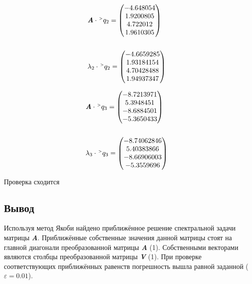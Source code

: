 \documentclass[a4paper, 14pt]{extarticle}
\begin{document}
\begin{center}
{\begin{minipage}{1.1\textwidth}
\begin{multicols}{4}
          \begin{align*}
            & \textbf{\textit{A}} \cdot \upgt q_2 = \begin{pmatrix}
              -4.648054 \\
                1.9200805 \\
               4.722012 \\
                1.9610305
              \end{pmatrix} \\\\
            & \lambda_2 \cdot \upgt q_2 = \begin{pmatrix}
              -4.6659285 \\
                1.93184154 \\
               4.70428488 \\
               1.94937347
              \end{pmatrix}
          \end{align*}

          \vspace{-3pt}

          \begin{align*}
            & \textbf{\textit{A}} \cdot \upgt q_3 = \begin{pmatrix}
              -8.7213971 \\
               5.3948451 \\
              -8.6884501 \\
              -5.3650433
              \end{pmatrix} \\\\
            & \lambda_3 \cdot \upgt q_3 = \begin{pmatrix}
              -8.74062846 \\
               5.40383866 \\
              -8.66906003 \\
              -5.3559696
              \end{pmatrix}
          \end{align*}
      \end{multicols}
    \end{minipage}
  }
\end{center}
\vspace{10pt}
\hspace{5mm} Проверка сходится


\subsection*{Вывод}

Используя метод Якоби найдено приближённое решение спектральной задачи матрицы \textbf{\textit{A}}. 
Приближённые собственные значения данной матрицы стоят на главной диагонали преобразованной матрицы
\textbf{\textit{A}} (1). Собственными векторами являются столбцы преобразованной матрицы 
\textbf{\textit{V}} (1). При проверке соответствующих приближённых равенств погрешность
вышла равной заданной ($\varepsilon = 0.01$).
\end{document}

